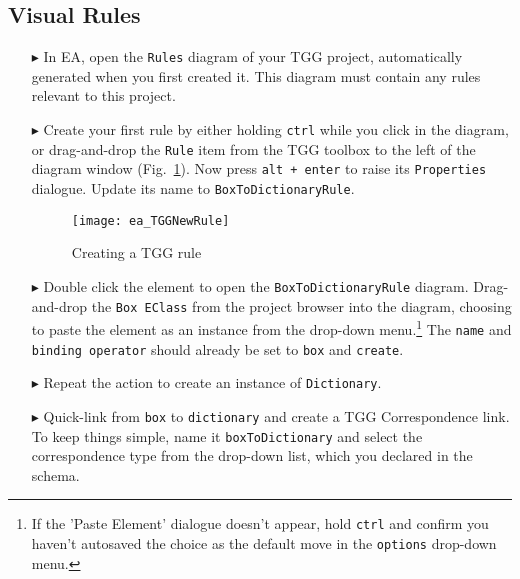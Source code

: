 \newpage
\hypertarget{rules vis}{}
\subsection{Visual Rules}
\visHeader

\begin{enumerate}
\item[$\blacktriangleright$] In EA, open the \texttt{Rules} diagram of your TGG project, automatically generated when you first created it. This diagram must
contain any rules relevant to this project.

\item[$\blacktriangleright$] Create your first rule by either holding \texttt{ctrl} while you click in the diagram, or drag-and-drop the \texttt{Rule} item from
the TGG toolbox to the left of the diagram window (Fig.~\ref{fig:create_tgg_rule}). Now press \texttt{alt + enter} to raise its \texttt{Properties} dialogue.
Update its name to \texttt{BoxToDictionaryRule}.

\vspace{0.5cm}

\begin{figure}[htbp]
\begin{center}
  \texttt{[image: ea\_TGGNewRule]}
  \caption{Creating a TGG rule}
  \label{fig:create_tgg_rule}
\end{center}
\end{figure}

\item[$\blacktriangleright$] Double click the element to open the \texttt{BoxToDictionaryRule} diagram. Drag-and-drop the \texttt{Box EClass} from the project
browser into the diagram, choosing to paste the element as an instance from the drop-down menu.\footnote{If the 'Paste Element' dialogue doesn't appear, hold
\texttt{ctrl} and confirm you haven't autosaved the choice as the default move in the \texttt{options} drop-down menu.} The \texttt{name} and \texttt{binding
operator} should already be set to \texttt{box} and \texttt{create}.

\item[$\blacktriangleright$] Repeat the action to create an instance of \texttt{Dictionary}.

\item[$\blacktriangleright$] Quick-link from \texttt{box} to \texttt{dictionary} and create a TGG Correspondence link. To keep things simple, name it
\texttt{boxToDictionary} and select the correspondence type from the drop-down list, which you declared in the schema.


\end{enumerate}
